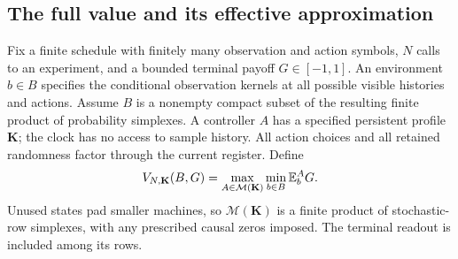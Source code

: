 \subsection{The full value and its effective approximation}
Fix a finite schedule with finitely many observation and action symbols,
$N$ calls to an experiment, and a bounded terminal payoff $G\in[-1,1]$.
An environment $b\in B$ specifies the conditional observation kernels
at all possible visible histories and actions. Assume $B$ is a nonempty
compact subset of the resulting finite product of probability simplexes.
A controller $A$ has a specified persistent profile $\mathbf K$; the
clock has no access to sample history. All action choices and all retained
randomness factor through the current register. Define
\begin{equation}\label{eq:v21-value}
 V_{N,\mathbf K}(B,G)=\max_{A\in\mathcal M(\mathbf K)}
                    \min_{b\in B}\mathbb E_b^A G.
\end{equation}
Unused states pad smaller machines, so $\mathcal M(\mathbf K)$ is a
finite product of stochastic-row simplexes, with any prescribed causal
zeros imposed. The terminal readout is included among its rows.

